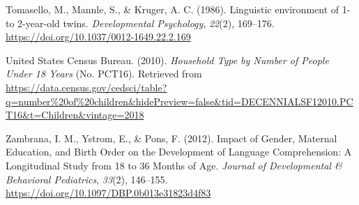 \documentclass[
  man,mask,floatsintext]{apa6}
\newlength{\cslhangindent}
\newlength{\cslentryspacingunit} %
\newenvironment{CSLReferences}[2] %
 {%
  \setlength{\parindent}{0pt}
  \ifodd #1
  \let\oldpar\par
  \def\par{\hangindent=\cslhangindent\oldpar}
  \fi
  \setlength{\parskip}{#2\cslentryspacingunit}
 }%
 {}
\begin{document}
\begin{CSLReferences}{1}{0}
\leavevmode{}%
Tomasello, M., Mannle, S., \& Kruger, A. C. (1986). Linguistic environment of 1- to 2-year-old twins. \emph{Developmental Psychology}, \emph{22}(2), 169--176. \url{https://doi.org/10.1037/0012-1649.22.2.169}

\leavevmode{}%
United States Census Bureau. (2010). \emph{Household {Type} by {Number} of {People} {Under} 18 {Years}} (No. PCT16). Retrieved from \url{https://data.census.gov/cedsci/table?q=number\%20of\%20children\&hidePreview=false\&tid=DECENNIALSF12010.PCT16\&t=Children\&vintage=2018}

\leavevmode{}%
Zambrana, I. M., Ystrom, E., \& Pons, F. (2012). Impact of {Gender}, {Maternal} {Education}, and {Birth} {Order} on the {Development} of {Language} {Comprehension}: {A} {Longitudinal} {Study} from 18 to 36 {Months} of {Age}. \emph{Journal of Developmental \& Behavioral Pediatrics}, \emph{33}(2), 146--155. \url{https://doi.org/10.1097/DBP.0b013e31823d4f83}

\end{CSLReferences}

\endgroup
\end{document}
